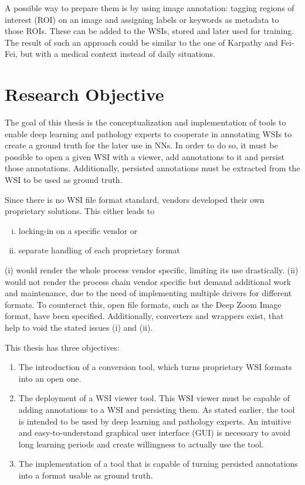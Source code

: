 A possible way to prepare them is by using image annotation: tagging regions of interest (ROI) on an image and assigning labels or keywords as metadata to those ROIs. These can be added to the WSIs, stored and later used for training. The result of such an approach could be similar to the one of Karpathy and Fei-Fei\cite{Karpathy15}, but with a medical context instead of daily situations.


\section{Research Objective}
\label{sec1_researchObjective}
The goal of this thesis is the conceptualization and implementation of tools to enable deep learning and pathology experts to cooperate in annotating WSIs to create a ground truth for the later use in NNs. In order to do so, it must be possible to open a given WSI with a viewer, add annotations to it and persist those annotations. Additionally, persisted annotations must be extracted from the WSI to be used as ground truth.

Since there is no WSI file format standard, vendors developed their own proprietary solutions\cite{Cornish13}. This either leads to

\begin{enumerate}[(i)]
	\item locking-in on a specific vendor or
	\item separate handling of each proprietary format
\end{enumerate}

(i) would render the whole process vendor specific, limiting its use drastically. (ii) would not render the process chain vendor specific but demand additional work and maintenance, due to the need of implementing multiple drivers for different formats. To counteract this, open file formats, such as the Deep Zoom Image format, have been specified\cite{Cornish13}. Additionally, converters and wrappers exist, that help to void the stated issues (i) and (ii). 

This thesis has three objectives:
\begin{enumerate}[(1)]
	\item The introduction of a conversion tool, which turns proprietary WSI formats into an open one.
	\item The deployment of a WSI viewer tool. This WSI viewer must be capable of adding annotations to a WSI and persisting them. As stated earlier, the tool is intended to be used by deep learning and pathology experts. An intuitive and easy-to-understand graphical user interface (GUI) is necessary to avoid long learning periods and create willingness to actually use the tool.
	\item The implementation of a tool that is capable of turning persisted annotations into a format usable as ground truth.
\end{enumerate}

